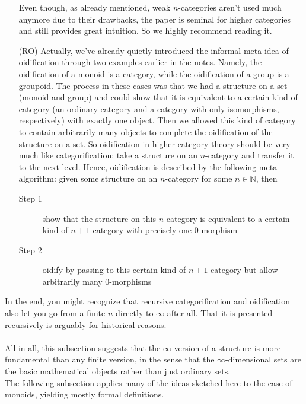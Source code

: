 \begin{enumerate}
Even though, as already mentioned, weak $n$-categories aren't used much anymore due to their drawbacks, the paper \cite{0d7b89ad} is seminal for higher categories and still provides great intuition.
So we highly recommend reading it.
\item[(RO)]
Actually, we've already quietly introduced the informal meta-idea of oidification through two examples earlier in the notes.
Namely, the oidification of a monoid is a category, while the oidification of a group is a groupoid.
The process in these cases was that we had a structure on a set (monoid and group) and could show that it is equivalent to a certain kind of category (an ordinary category and a category with only isomorphisms, respectively) with exactly one object.
Then we allowed this kind of category to contain arbitrarily many objects to complete the oidification of the structure on a set.
So oidification in higher category theory should be very much like categorification: take a structure on an $n$-category and transfer it to the next level.
Hence, oidification is described by the following meta-algorithm: given some structure on an $n$-category for some $n \in \mathbb{N}$, then
\begin{description}
\item[Step 1]
show that the structure on this $n$-category is equivalent to a certain kind of $n+1$-category with precisely one $0$-morphism
\item[Step 2]
oidify by passing to this certain kind of $n+1$-category but allow arbitrarily many $0$-morphisms
\end{description}
\end{enumerate}
In the end, you might recognize that recursive categorification and oidification also let you go from a finite $n$ directly to $\infty$ after all.
That it is presented recursively is arguably for historical reasons.
\\\\
All in all, this subsection suggests that the $\infty$-version of a structure is more fundamental than any finite version, in the sense that the $\infty$-dimensional sets are the basic mathematical objects rather than just ordinary sets.
\\
The following subsection applies many of the ideas sketched here to the case of monoids, yielding mostly formal definitions.
